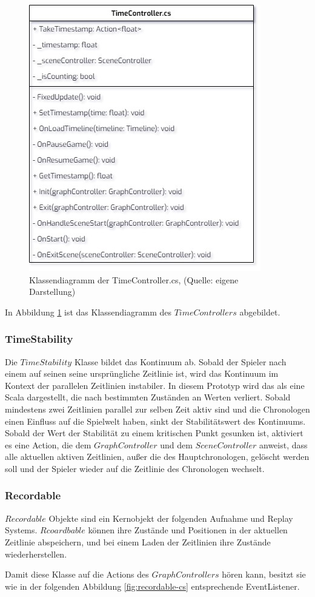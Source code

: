 \begin{figure}[ht]
\centering
\includegraphics[width=0.4\linewidth]{content/pictures/TimeController.jpg}
\caption{Klassendiagramm der TimeController.cs, (Quelle: eigene Darstellung)}
\label{fig:timeController-cs}
\end{figure}

In Abbildung \ref{fig:timeController-cs} ist das Klassendiagramm des $TimeControllers$ abgebildet.

\subsubsection{TimeStability}
Die $TimeStability$ Klasse bildet das Kontinuum ab. Sobald der Spieler nach einem  auf seinen seine ursprüngliche Zeitlinie  ist, wird das Kontinuum im Kontext der parallelen Zeitlinien instabiler. In diesem Prototyp wird das als eine Scala dargestellt, die nach bestimmten Zuständen an Werten verliert. Sobald mindestens zwei Zeitlinien parallel zur selben Zeit aktiv sind und die Chronologen einen Einfluss auf die Spielwelt haben, sinkt der Stabilitätswert des Kontinuums. Sobald der Wert der Stabilität zu einem kritischen Punkt gesunken ist, aktiviert es eine Action, die dem $GraphController$ und dem $SceneController$ anweist, dass alle aktuellen aktiven Zeitlinien, außer die des Hauptchronologen, gelöscht werden soll und der Spieler wieder auf die Zeitlinie des Chronologen wechselt.
\subsubsection{Recordable}
$Recordable$ Objekte sind ein Kernobjekt der folgenden Aufnahme und Replay Systems. $Rcoardbable$ können ihre Zustände und Positionen in der aktuellen Zeitlinie abspeichern, und bei einem Laden der Zeitlinien ihre Zustände wiederherstellen.

Damit diese Klasse auf die Actions des $GraphControllers$ hören kann, besitzt sie wie in der folgenden Abbildung \ref{fig:recordable-cs} entsprechende EventListener.

